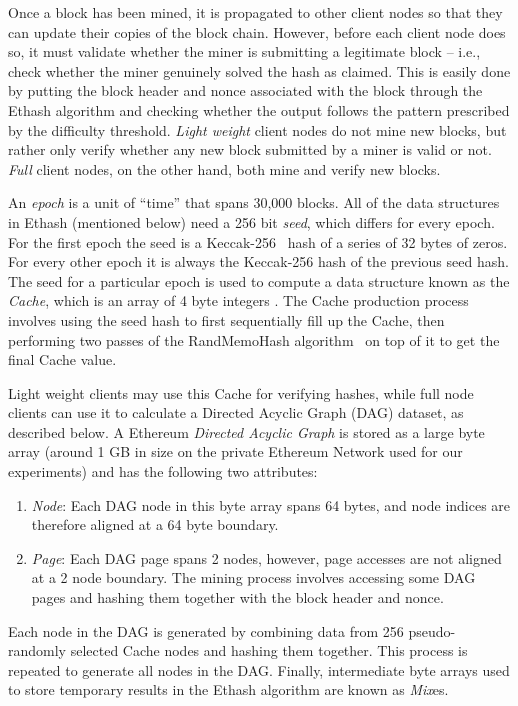 \documentclass[runningheads]{llncs}
\begin{document}
Once a block has been mined, it is propagated to other client nodes so that they can update their copies of the block chain. However, before each client node does so, it must validate whether the miner is submitting a legitimate block -- i.e., check whether the miner genuinely solved the hash as claimed. This is easily done by putting the block header and nonce associated with the block through the Ethash algorithm and checking whether the output follows the pattern prescribed by the difficulty threshold.  \emph{Light weight} client nodes do not mine new blocks, but rather only verify whether any new block submitted by a miner is valid or not.  \emph{Full} client nodes, on the other hand, both mine and verify new blocks.

An \emph{epoch} is a unit of ``time'' that spans 30,000 blocks.  All of the data structures in Ethash (mentioned below) need a 256 bit \emph{seed}, which differs for every epoch. For the first epoch the seed is a Keccak-256~\cite{keccak} hash of a series of 32 bytes of zeros. For every other epoch it is always the Keccak-256 hash of the previous seed hash.  The seed for a particular epoch is used to compute a data structure known as the \emph{Cache}, which is an array of 4 byte integers \cite{Ethmining}. The Cache production process involves using the seed hash to first sequentially fill up the Cache, then performing two passes of the RandMemoHash algorithm~\cite{randmemohash} on top of it to get the final Cache value. 

Light weight clients may use this Cache for verifying hashes, while full node clients can use it to calculate a Directed Acyclic Graph (DAG) dataset, as described below.  A Ethereum \emph{Directed Acyclic Graph} is stored as a large byte array (around 1 GB in size on the private Ethereum Network used for our experiments) and has the following two attributes:
  \begin{enumerate}
  \item \emph{Node}: Each DAG node in this byte array spans 64 bytes, and node indices are therefore aligned at a 64 byte boundary.
  \item \emph{Page}: Each DAG page spans 2 nodes, however, page accesses are not aligned at a 2 node boundary. The mining process involves accessing some DAG pages and hashing them together with the block header and nonce.
  \end{enumerate}
Each node in the DAG is generated by combining data from 256 pseudo-randomly selected Cache nodes and hashing them together. This process is repeated to generate all nodes in the DAG. Finally, intermediate byte arrays used to store temporary results in the Ethash algorithm are known as \emph{Mix}es.
\end{document}
